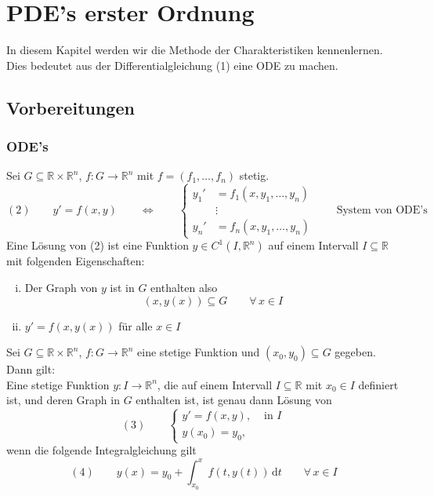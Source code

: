 \section{PDE's erster Ordnung} 
\label{sec:pde_s_erster_ordnung}
In diesem Kapitel werden wir die Methode der Charakteristiken kennenlernen. Dies bedeutet aus der Differentialgleichung (1) eine ODE zu machen. 
\subsection{Vorbereitungen} 
\label{sub:vorbereitungen}
\subsubsection{ODE's} 
\label{ssub:ode_s}
Sei $G \subseteq \mathbb{R} \times \mathbb{R}^n$, $f: G \to  \mathbb{R}^n$ mit $f= (f_1,\dots,f_n)$ stetig.
\[
	(2) \qquad y' = f(x,y) \qquad \Leftrightarrow \qquad \begin{cases}
		y_1'&=f_1(x,y_1,\dots,y_n)\\
		&\vdots \\
		y_n' &= f_n(x,y_1,\dots,y_n)
	\end{cases}\qquad \text{System von ODE's}
\]
Eine Lösung von (2) ist eine Funktion $y \in C^1(I,\mathbb{R}^n)$ auf einem Intervall $I \subseteq \mathbb{R}$ mit folgenden Eigenschaften:
\begin{enumerate}[(i)]
	\item Der Graph von $y$ ist in $G$ enthalten also 
	\[
		(x,y(x)) \subseteq G \qquad \forall\, x \in I
	\]
	\item $y'=f(x,y(x))$ für alle $x \in I$
\end{enumerate}
\begin{satz}
	Sei $G \subseteq \mathbb{R}\times \mathbb{R}^n$, $f: G \to \mathbb{R}^n$ eine stetige Funktion und $(x_0,y_0) \subseteq G$ gegeben. Dann gilt: \\
	Eine stetige Funktion $y: I \to \mathbb{R}^n$, die auf einem Intervall $I \subseteq \mathbb{R}$ mit $x_0 \in I$ definiert ist, und deren Graph in $G$ enthalten
	 ist, ist genau dann Lösung von
	\[
		(3) \qquad  \begin{cases}
			y' = f(x,y), &\text{ in }I\\
			y(x_0) = y_0,
		\end{cases}
	\]wenn die folgende Integralgleichung gilt
	\[
		(4) \qquad y(x) = y_0 + \int_{x_0}^{x} f(t,y(t)) \,\mathrm{d}t \qquad \forall\, x \in I
	\]
\end{satz}
